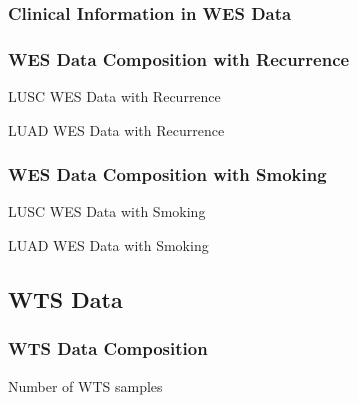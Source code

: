 \documentclass{beamer}
\begin{document}
    \subsubsection{Clinical Information in WES Data}
    \begin{frame}[allowframebreaks]
        \frametitle{WES Data Composition with Recurrence}

        \begin{table}
            \caption{LUSC WES Data with Recurrence}
            \resizebox{!}{0.3 \textheight}
            {}
        \end{table}

        \begin{table}
            \caption{LUAD WES Data with Recurrence}
            
        \end{table}
    \end{frame}

    \begin{frame}[allowframebreaks]
        \frametitle{WES Data Composition with Smoking}

        \begin{table}
            \caption{LUSC WES Data with Smoking}
            \resizebox{!}{0.3 \textheight}
            {}
        \end{table}

        \begin{table}
            \caption{LUAD WES Data with Smoking}
            \resizebox{!}{0.3 \textheight}
            {}
        \end{table}
    \end{frame}

    \subsection{WTS Data}
    \begin{frame}
        \frametitle{WTS Data Composition}

        \begin{table}
            \caption{Number of WTS samples}
            
        \end{table}
    \end{frame}
\end{document}
